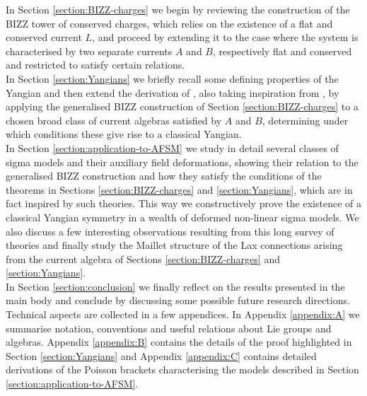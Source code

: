 \documentclass[12pt]{article}
\numberwithin{equation}{section}
\begin{document}
In Section \ref{section:BIZZ-charges} we begin by reviewing the construction of the BIZZ tower of conserved charges, which relies on the existence of a flat and conserved current $L$, and proceed by extending it to the case where the system is characterised by two separate currents $A$ and $B$, respectively flat and conserved and restricted to satisfy certain relations.\\
\indent
In Section \ref{section:Yangians} we briefly recall some defining properties of the Yangian and then extend the derivation of \cite{MacKay:1992he}, also taking inspiration from \cite{Klose:2016qfv},  by applying the generalised BIZZ construction of Section \ref{section:BIZZ-charges} to a chosen broad class of current algebras satisfied by $A$ and $B$, determining under which conditions these give rise to a classical Yangian.\\
\indent
In Section \ref{section:application-to-AFSM} we study in detail several classes of sigma models and their auxiliary field deformations, showing their relation to the generalised BIZZ construction and how they satisfy the conditions of the theorems in Sections \ref{section:BIZZ-charges} and \ref{section:Yangians}, which are in fact inspired by such theories. This way we constructively prove the existence of a classical Yangian symmetry in a wealth of deformed non-linear sigma models.
We also discuss a few interesting observations resulting from this long survey of theories and finally study the Maillet structure of the Lax connections arising from the current algebra of Sections \ref{section:BIZZ-charges} and \ref{section:Yangians}.
\\
\indent
In Section \ref{section:conclusion} we finally reflect on the results presented in the main body and conclude by discussing some possible future research directions.\\
\indent
Technical aspects are collected in a few appendices. In Appendix \ref{appendix:A} we summarise notation, conventions and useful relations about Lie groups and algebras. Appendix \ref{appendix:B} contains the details of the proof highlighted in Section \ref{section:Yangians} and
Appendix \ref{appendix:C} contains detailed derivations of the Poisson brackets characterising the models described in Section \ref{section:application-to-AFSM}.
\end{document}
